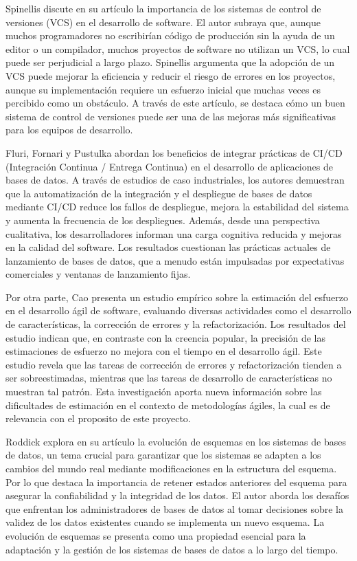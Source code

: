 \documentclass{IEEEtran}
\begin{document}
Spinellis \cite{spinellis2005version} discute en su artículo la importancia de los sistemas de control de versiones (VCS) en el desarrollo de software. El autor subraya que, aunque muchos programadores no escribirían código de producción sin la ayuda de un editor o un compilador, muchos proyectos de software no utilizan un VCS, lo cual puede ser perjudicial a largo plazo. Spinellis argumenta que la adopción de un VCS puede mejorar la eficiencia y reducir el riesgo de errores en los proyectos, aunque su implementación requiere un esfuerzo inicial que muchas veces es percibido como un obstáculo. A través de este artículo, se destaca cómo un buen sistema de control de versiones puede ser una de las mejoras más significativas para los equipos de desarrollo.


Fluri, Fornari y Pustulka \cite{fluri2023measuring} abordan los beneficios de integrar prácticas de CI/CD (Integración Continua / Entrega Continua) en el desarrollo de aplicaciones de bases de datos. A través de estudios de caso industriales, los autores demuestran que la automatización de la integración y el despliegue de bases de datos mediante CI/CD reduce los fallos de despliegue, mejora la estabilidad del sistema y aumenta la frecuencia de los despliegues. Además, desde una perspectiva cualitativa, los desarrolladores informan una carga cognitiva reducida y mejoras en la calidad del software. Los resultados cuestionan las prácticas actuales de lanzamiento de bases de datos, que a menudo están impulsadas por expectativas comerciales y ventanas de lanzamiento fijas.


Por otra parte, Cao \cite{cao2022estimating} presenta un estudio empírico sobre la estimación del esfuerzo en el desarrollo ágil de software, evaluando diversas actividades como el desarrollo de características, la corrección de errores y la refactorización. Los resultados del estudio indican que, en contraste con la creencia popular, la precisión de las estimaciones de esfuerzo no mejora con el tiempo en el desarrollo ágil. Este estudio revela que las tareas de corrección de errores y refactorización tienden a ser sobreestimadas, mientras que las tareas de desarrollo de características no muestran tal patrón. Esta investigación aporta nueva información sobre las dificultades de estimación en el contexto de metodologías ágiles, la cual es de relevancia con el proposito de este proyecto.


Roddick \cite{roddick1992schema} explora en su artículo la evolución de esquemas en los sistemas de bases de datos, un tema crucial para garantizar que los sistemas se adapten a los cambios del mundo real mediante modificaciones en la estructura del esquema. Por lo que destaca la importancia de retener estados anteriores del esquema para asegurar la confiabilidad y la integridad de los datos. El autor aborda los desafíos que enfrentan los administradores de bases de datos al tomar decisiones sobre la validez de los datos existentes cuando se implementa un nuevo esquema. La evolución de esquemas se presenta como una propiedad esencial para la adaptación y la gestión de los sistemas de bases de datos a lo largo del tiempo.
\end{document}
